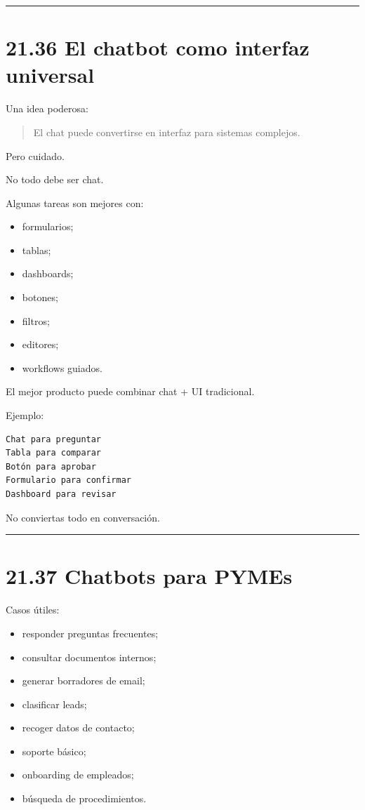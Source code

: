 \begin{center}\rule{0.5\linewidth}{0.5pt}\end{center}

\section{21.36 El chatbot como interfaz
universal}\label{el-chatbot-como-interfaz-universal}

Una idea poderosa:

\begin{quote}
El chat puede convertirse en interfaz para sistemas complejos.
\end{quote}

Pero cuidado.

No todo debe ser chat.

Algunas tareas son mejores con:

\begin{itemize}
\tightlist
\item
  formularios;
\item
  tablas;
\item
  dashboards;
\item
  botones;
\item
  filtros;
\item
  editores;
\item
  workflows guiados.
\end{itemize}

El mejor producto puede combinar chat + UI tradicional.

Ejemplo:

\begin{lstlisting}
Chat para preguntar
Tabla para comparar
Botón para aprobar
Formulario para confirmar
Dashboard para revisar
\end{lstlisting}

No conviertas todo en conversación.

\begin{center}\rule{0.5\linewidth}{0.5pt}\end{center}

\section{21.37 Chatbots para PYMEs}\label{chatbots-para-pymes}

Casos útiles:

\begin{itemize}
\tightlist
\item
  responder preguntas frecuentes;
\item
  consultar documentos internos;
\item
  generar borradores de email;
\item
  clasificar leads;
\item
  recoger datos de contacto;
\item
  soporte básico;
\item
  onboarding de empleados;
\item
  búsqueda de procedimientos.
\end{itemize}

